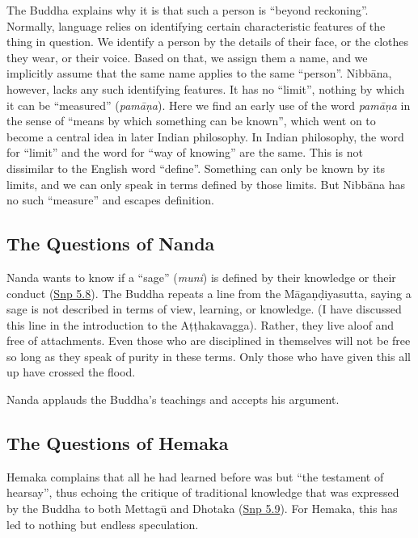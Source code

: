 \documentclass[12pt,openany]{book}%
\begin{document}
The Buddha explains why it is that such a person is “beyond reckoning”. Normally, language relies on identifying certain characteristic features of the thing in question. We identify a person by the details of their face, or the clothes they wear, or their voice. Based on that, we assign them a name, and we implicitly assume that the same name applies to the same “person”. \textsanskrit{Nibbāna}, however, lacks any such identifying features. It has no “limit”, nothing by which it can be “measured” (\textit{\textsanskrit{pamāṇa}}). Here we find an early use of the word \textit{\textsanskrit{pamāṇa}} in the sense of “means by which something can be known”, which went on to become a central idea in later Indian philosophy. In Indian philosophy, the word for “limit” and the word for “way of knowing” are the same. This is not dissimilar to the English word “define”. Something can only be known by its limits, and we can only speak in terms defined by those limits. But \textsanskrit{Nibbāna} has no such “measure” and escapes definition.

\subsection*{The Questions of Nanda}

Nanda wants to know if a “sage” (\textit{muni}) is defined by their knowledge or their conduct (\href{https://suttacentral.net/snp5.8/en/sujato}{Snp 5.8}). The Buddha repeats a line from the \textsanskrit{Māgaṇḍiyasutta}, saying a sage is not described in terms of view, learning, or knowledge. (I have discussed this line in the introduction to the \textsanskrit{Aṭṭhakavagga}). Rather, they live aloof and free of attachments. Even those who are disciplined in themselves will not be free so long as they speak of purity in these terms. Only those who have given this all up have crossed the flood.

Nanda applauds the Buddha’s teachings and accepts his argument.

\subsection*{The Questions of Hemaka}

Hemaka complains that all he had learned before was but “the testament of hearsay”, thus echoing the critique of traditional knowledge that was expressed by the Buddha to both \textsanskrit{Mettagū} and Dhotaka (\href{https://suttacentral.net/snp5.9/en/sujato}{Snp 5.9}). For Hemaka, this has led to nothing but endless speculation.
\end{document}
